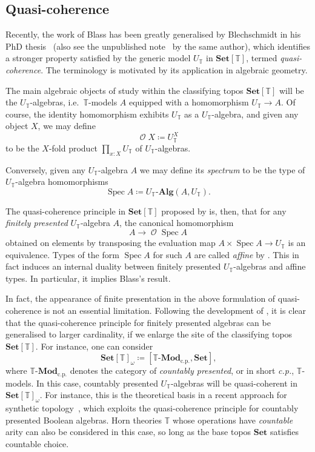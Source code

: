 \documentclass[a4paper,12pt]{amsart}
\theoremstyle{definition}
\newcommand{\mc}[1]{\mathcal{#1}}
\newcommand{\mb}[1]{\mathbf{#1}}
\newcommand{\mbb}[1]{\mathbb{#1}}
\newcommand{\T}{\mbb T}
\newcommand{\mr}[1]{\mathrm{#1}}
\newcommand{\Set}{\mb{Set}}
\newcommand{\alg}{\text{-}\mb{Alg}}
\newcommand{\cp}{_{\mr{c.p.}}}
\newcommand{\mmod}[1]{#1\text{-}\mathbf{Mod}}
\newcommand{\spec}{\operatorname{Spec}}
\newcommand{\opens}{\operatorname{\mc{O}}} %
\begin{document}
\subsection{Quasi-coherence}\label{subsec:qc}

Recently, the work of Blass has been greatly generalised by Blechschmidt in his PhD thesis~\citep{blechschmidt2021using} (also see the unpublished note~\citep{blechschmidt2020general} by the same author), which identifies a stronger property satisfied by the generic model $U_\T$ in $\Set[\T]$, termed \emph{quasi-coherence}. The terminology is motivated by its application in algebraic geometry.

The main algebraic objects of study within the classifying topos $\Set[\T]$ will be the $U_\T$-algebras, i.e.\ $\T$-models $A$ equipped with a homomorphism $U_\T\to A$. Of course, the identity homomorphism exhibits $U_\T$ as a $U_\T$-algebra, and given any object $X$, we may define \[\opens X\coloneq U_\T^X\] to be the $X$-fold product $\prod_{x:X}U_\T$ of $U_\T$-algebras. 

Conversely, given any $U_\T$-algebra $A$ we may define its \emph{spectrum} to be the type of $U_\T$-algebra homomorphisms 
\[ \spec A \coloneq U_\T\alg(A,U_\T)\text{.}\]

The quasi-coherence principle in $\Set[\T]$ proposed by \citet{blechschmidt2021using} is, then, that for any \emph{finitely presented} $U_\T$-algebra $A$, the canonical homomorphism
\[
  A\to \opens\spec A
\]
obtained on elements by transposing the evaluation map $A\times \spec A\to U_\T$ is an equivalence.
Types of the form $\spec A$ for such $A$ are called \emph{affine} by \citet{blechschmidt2021using}. This in fact induces an internal duality between finitely presented $U_\T$-algebras and affine types. In particular, it implies Blass's result. 

In fact, the appearance of finite presentation in the above formulation of quasi-coherence is not an essential limitation. Following the development of \citet{blechschmidt2021using,blechschmidt2020general}, it is clear that the quasi-coherence principle for finitely presented algebras can be generalised to larger cardinality,
if we enlarge the site of the classifying topos $\Set[\T]$. For instance, one can consider
\[ \Set[\T]_\omega \coloneq [\mmod\T\cp,\Set]\text{,} \]
where $\mmod\T\cp$ denotes the category of \emph{countably presented}, or in short \emph{c.p.}, $\T$-models. In this case, countably presented $U_\T$-algebras will be quasi-coherent in $\Set[\T]_\omega$. For instance, this is the theoretical basis in a recent approach for synthetic topology~\citep{cherubini2024foundation}, which exploits the quasi-coherence principle for countably presented Boolean algebras. Horn theories $\T$ whose operations have \emph{countable} arity can also be considered in this case, so long as the base topos $\Set$ satisfies countable choice.
\end{document}
